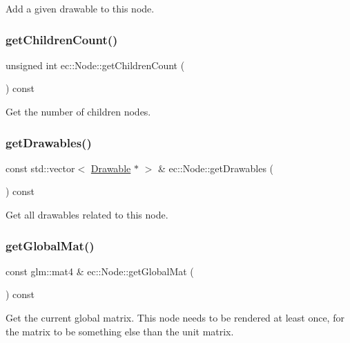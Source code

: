 Add a given drawable to this node. \mbox{\label{classec_1_1_node_a3fb0342e532d42984870f598ec4d0ba3}} 
\subsubsection{\texorpdfstring{get\+Children\+Count()}{getChildrenCount()}}
{\footnotesize\ttfamily unsigned int ec\+::\+Node\+::get\+Children\+Count (\begin{DoxyParamCaption}{ }\end{DoxyParamCaption}) const}

Get the number of children nodes. \mbox{\label{classec_1_1_node_a2403cd39000eceffdec878133f621e3a}} 
\subsubsection{\texorpdfstring{get\+Drawables()}{getDrawables()}}
{\footnotesize\ttfamily const std\+::vector$<$ \mbox{\hyperlink{classec_1_1_drawable}{Drawable}} $\ast$ $>$ \& ec\+::\+Node\+::get\+Drawables (\begin{DoxyParamCaption}{ }\end{DoxyParamCaption}) const\hspace{0.3cm}{\ttfamily [virtual]}}

Get all drawables related to this node. \mbox{\label{classec_1_1_node_aecf550ed169a643bd9c23979377d8afc}} 
\subsubsection{\texorpdfstring{get\+Global\+Mat()}{getGlobalMat()}}
{\footnotesize\ttfamily const glm\+::mat4 \& ec\+::\+Node\+::get\+Global\+Mat (\begin{DoxyParamCaption}{ }\end{DoxyParamCaption}) const}

Get the current global matrix. This node needs to be rendered at least once, for the matrix to be something else than the unit matrix. \mbox{\label{classec_1_1_node_ab4072f05f2b51e3d76f67e8557fc2134}} 
